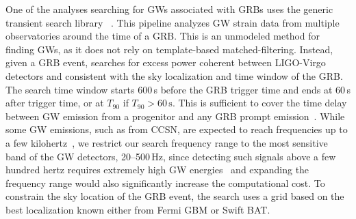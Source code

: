 One of the analyses searching for \acp{GW} associated with \acp{GRB} uses the generic transient search library \xpip~\citep{Sutton_2010}.
This pipeline analyzes \ac{GW} strain data from multiple observatories around the time of a \ac{GRB}.
This is an unmodeled method for finding \acp{GW}, as it does not rely on template-based matched-filtering.
Instead, given a \ac{GRB} event, \xpip searches for excess power coherent between LIGO-Virgo detectors and consistent with the sky localization and time window of the \ac{GRB}.
The search time window starts 600\,s before the GRB trigger time and ends at 60\,s after trigger time, or at $T_{90}$ if $T_{90} > 60\,\text{s}$.
This is sufficient to cover the time delay between GW emission from a progenitor and any GRB prompt emission~\citep{Koshut_1995, Aloy_2000, MacFadyen_2001, Zhang_2003, Lazzati_2005, Wang_2007, Burlon_2008, Burlon_2009, Lazzati_2009, Vedrenne_2009}.
While some GW emissions, such as from \ac{CCSN}, are expected to reach frequencies up to a few kilohertz~\citep{Radice_2019}, we restrict our search frequency range to the most sensitive band of the GW detectors, 20–500\,Hz, since detecting such signals above a few hundred hertz requires extremely high GW energies~\citep{burst_o2} and expanding the frequency range would also significantly increase the computational cost. To constrain the sky location of the GRB event, the search uses a grid based on the best localization known either from Fermi \ac{GBM} or Swift \ac{BAT}.

